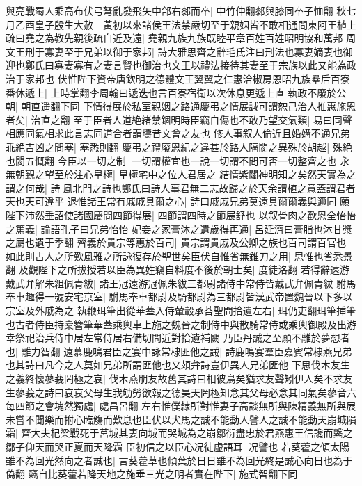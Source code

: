 與亮戰蜀人乘高布伏弓弩亂發飛矢中郃右䣛而卒|{
	中竹仲翻䣛與膝同卒子恤翻}
秋七月乙酉皇子殷生大赦　黃初以來諸侯王法禁嚴切至于親姻皆不敢相通問東阿王植上疏曰堯之為教先親後疏自近及遠|{
	堯親九族九族既睦平章百姓百姓昭明協和萬邦}
周文王刑于寡妻至于兄弟以御于家邦|{
	詩大雅思齊之辭毛氏注曰刑法也寡妻嫡妻也御迎也鄭氏曰寡妻寡有之妻言賢也御治也文王以禮法接待其妻至于宗族以此又能為政治于家邦也}
伏惟陛下資帝唐欽明之德體文王翼翼之仁惠洽椒房恩昭九族羣后百寮番休遞上|{
	上時掌翻李周翰曰遞迭也言百寮宿衛以次休息更遞上直}
執政不廢於公朝|{
	朝直遥翻下同}
下情得展於私室親姻之路通慶弔之情展誠可謂恕己治人推惠施恩者矣|{
	治直之翻}
至于臣者人道絶緒禁錮明時臣竊自傷也不敢乃望交氣類|{
	易曰同聲相應同氣相求此言志同道合者謂疇昔文會之友也}
修人事叙人倫近且婚媾不通兄弟乖絶吉凶之問塞|{
	塞悉則翻}
慶弔之禮廢恩紀之違甚於路人隔閡之異殊於胡越|{
	殊絶也閡五慨翻}
今臣以一切之制|{
	一切謂權宜也一說一切謂不問可否一切整齊之也}
永無朝覲之望至於注心皇極|{
	皇極宅中之位人君居之}
結情紫闥神明知之矣然天實為之謂之何哉|{
	詩風北門之詩也鄭氏曰詩人事君無二志故歸之於天余謂植之意蓋謂君者天也天可違乎}
退惟諸王常有戚戚具爾之心|{
	詩曰戚戚兄弟莫遠具爾爾義與邇同}
願陛下沛然垂詔使諸國慶問四節得展|{
	四節謂四時之節展舒也}
以叙骨肉之歡恩全怡怡之篤義|{
	論語孔子曰兄弟怡怡}
妃妾之家膏沐之遺歲得再通|{
	呂延濟曰膏脂也沐甘漿之屬也遺于季翻}
齊義於貴宗等惠於百司|{
	貴宗謂貴戚及公卿之族也百司謂百官也}
如此則古人之所歎風雅之所詠復存於聖世矣臣伏自惟省無錐刀之用|{
	思惟也省悉景翻}
及觀陛下之所拔授若以臣為異姓竊自料度不後於朝士矣|{
	度徒洛翻}
若得辭遠游戴武弁解朱組佩青紱|{
	諸王冠遠游冠佩朱紱三都尉諸侍中常侍皆戴武弁佩青紱}
駙馬奉車趣得一號安宅京室|{
	駙馬奉車都尉及騎都尉為三都尉皆漢武帝置魏晉以下多以宗室及外戚為之}
執鞭珥筆出從華蓋入侍輦轂承荅聖問拾遺左右|{
	珥仍吏翻珥筆挿筆也古者侍臣持槖簪筆華蓋乘輿車上施之魏晉之制侍中與散騎常侍或乘輿御殿及出游幸祭祀治兵侍中居左常侍居右備切問近對拾遺補闕}
乃臣丹誠之至願不離於夢想者也|{
	離力智翻}
遠慕鹿鳴君臣之宴中詠常棣匪他之誡|{
	詩鹿鳴宴羣臣嘉賓常棣燕兄弟也其詩曰凡今之人莫如兄弟所謂匪他也又頍弁詩豈伊異人兄弟匪他}
下思伐木友生之義終懷蓼莪罔極之哀|{
	伐木燕朋友故舊其詩曰相彼鳥矣猶求友聲矧伊人矣不求友生蓼莪之詩曰哀哀父母生我劬勞欲報之德昊天罔極知念其父母必念其同氣矣蓼音六}
每四節之會塊然獨處|{
	處昌呂翻}
左右惟僕隸所對惟妻子高談無所與陳精義無所與展未嘗不聞樂而拊心臨觴而歎息也臣伏以犬馬之誠不能動人譬人之誠不能動天崩城隕霜|{
	齊大夫杞梁戰死于莒城其妻向城而哭城為之崩鄒衍盡忠於君燕惠王信讒而繫之鄒子仰天而哭正夏而天降霜}
臣初信之以臣心况徒虚語耳|{
	况譬也}
若葵藿之傾太陽雖不為回光然向之者誠也|{
	言葵藿草也傾葉於日日雖不為回光終是誠心向日也為于偽翻}
竊自比葵藿若降天地之施垂三光之明者實在陛下|{
	施式智翻下同}
